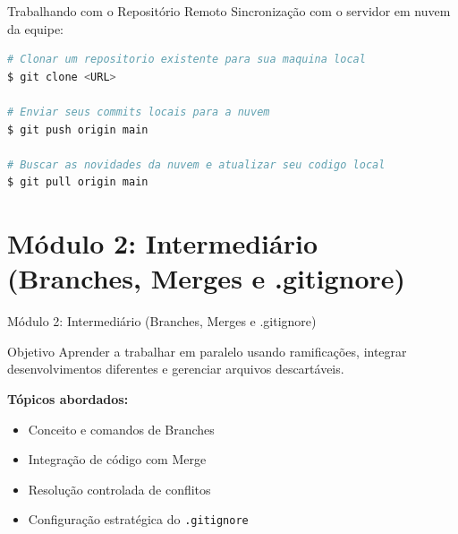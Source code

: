 \documentclass[10pt,aspectratio=169]{beamer}
\begin{document}
\begin{frame}[fragile]{Trabalhando com o Repositório Remoto}
    Sincronização com o servidor em nuvem da equipe:
    \vspace{0.2cm}
    \begin{lstlisting}[language=bash]
# Clonar um repositorio existente para sua maquina local
$ git clone <URL>

# Enviar seus commits locais para a nuvem
$ git push origin main 

# Buscar as novidades da nuvem e atualizar seu codigo local
$ git pull origin main
    \end{lstlisting}
\end{frame}

\section{Módulo 2: Intermediário (Branches, Merges e .gitignore)}

\begin{frame}{Módulo 2: Intermediário (Branches, Merges e .gitignore)}
    \begin{block}{Objetivo}
        Aprender a trabalhar em paralelo usando ramificações, integrar desenvolvimentos diferentes e gerenciar arquivos descartáveis.
    \end{block}
    \vspace{0.5cm}
    \textbf{Tópicos abordados:}
    \begin{itemize}
        \item Conceito e comandos de Branches
        \item Integração de código com Merge
        \item Resolução controlada de conflitos
        \item Configuração estratégica do \texttt{.gitignore}
    \end{itemize}
\end{frame}
\end{document}
